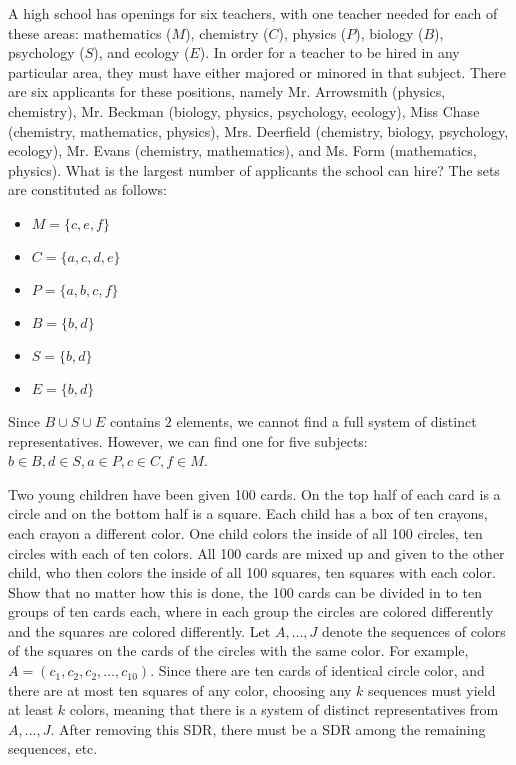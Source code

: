 \documentclass[8pt]{extarticle}
\begin{document}
  \begin{problem}{5}
    A high school has openings for six teachers, with one teacher needed for each of these areas: mathematics ($M$), chemistry ($C$), physics ($P$), biology ($B$), psychology ($S$), and ecology ($E$). In order for a teacher to be hired in any particular area, they must have either majored or minored in that subject. There are six applicants for these positions, namely Mr. Arrowsmith (physics, chemistry), Mr. Beckman (biology, physics, psychology, ecology), Miss Chase (chemistry, mathematics, physics), Mrs. Deerfield (chemistry, biology, psychology, ecology), Mr. Evans (chemistry, mathematics), and Ms. Form (mathematics, physics). What is the largest number of applicants the school can hire?
    \tcblower
    The sets are constituted as follows:
    \begin{itemize}
      \item $M = \{c,e,f\}$
      \item $C = \{a,c,d,e\}$
      \item $P = \{a,b,c,f\}$
      \item $B = \{b,d\}$
      \item $S = \{b,d\}$
      \item $E = \{b,d\}$
    \end{itemize}
    Since $B\cup S\cup E$ contains $2$ elements, we cannot find a full system of distinct representatives. However, we can find one for five subjects: $b\in B, d\in S,a\in P,c\in C,f\in M$.
  \end{problem}
  \begin{problem}{6}
    Two young children have been given 100 cards. On the top half of each card is a circle and on the bottom half is a square. Each child has a box of ten crayons, each crayon a different color. One child colors the inside of all 100 circles, ten circles with each of ten colors. All 100 cards are mixed up and given to the other child, who then colors the inside of all 100 squares, ten squares with each color. Show that no matter how this is done, the 100 cards can be divided in to ten groups of ten cards each, where in each group the circles are colored differently and the squares are colored differently.
    \tcblower
    Let $A,\dots,J$ denote the sequences of colors of the squares on the cards of the circles with the same color. For example, $A = (c_1,c_2,c_2,\dots,c_{10})$. Since there are ten cards of identical circle color, and there are at most ten squares of any color, choosing any $k$ sequences must yield at least $k$ colors, meaning that there is a system of distinct representatives from $A,\dots,J$. After removing this SDR, there must be a SDR among the remaining sequences, etc.
  \end{problem}
\end{document}

